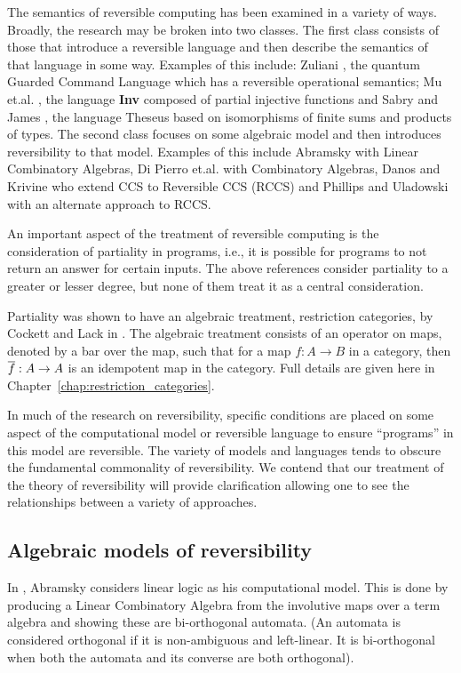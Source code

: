 The semantics of reversible computing has been examined in a variety of ways. Broadly, the research
may be broken into two classes. The first class consists of those that introduce a reversible
language and then describe the semantics of that language in some way. Examples of this include:
Zuliani \cite{zuliani01:reversibility}, the quantum Guarded Command Language which has a reversible
operational semantics; Mu et.al. \cite{muetal04:injreversible}, the language \textbf{Inv} composed
of partial injective functions and Sabry and James \cite{james2014theseus}, the language Theseus
based on isomorphisms of finite sums and products of types. The second class focuses on some
algebraic model and then introduces reversibility to that model. Examples of this include Abramsky
\cite{abramsky05:reversible} with Linear Combinatory Algebras, Di Pierro
et.al. \cite{DiPierro200625} with Combinatory Algebras, Danos and Krivine \cite{danos2004reversible}
who extend CCS\cite{milner1980calculus} to Reversible CCS (RCCS) and Phillips and Uladowski
\cite{phillips2006operational} with an alternate approach to RCCS.


An important aspect of the treatment of reversible computing is the consideration of partiality in
programs, i.e., it is possible for programs to not return an answer for certain inputs. The above
references consider partiality to a greater or lesser degree, but none of them treat it as a central
consideration.

Partiality was shown to have an algebraic treatment, restriction categories, by Cockett and Lack in
\cite{cockett2002:restcategories1,cockettlack2003:restcategories2,cockettlack2004:restcategories3}. The
algebraic treatment consists of an operator on maps, denoted by a bar over the map, such that for a
map $f:A\to B$ in a category, then $\overline{f}:A\to A$ is an idempotent map in the category. Full
details are given here in Chapter~\ref{chap:restriction_categories}.

In much of the research on reversibility, specific conditions are placed on some aspect of the
computational model or reversible language to ensure ``programs'' in this model are reversible.
The variety of models and languages tends to obscure the fundamental commonality of reversibility.
We contend that our treatment of the theory of reversibility will provide clarification allowing one
to see the relationships between a variety of approaches.

\subsection{Algebraic models of reversibility}
\label{subsec:algebraic_models_of_reversibility}
In \cite{abramsky05:reversible}, Abramsky considers linear logic as his computational model. This is
done by producing a Linear Combinatory Algebra \cite{abramsky02:GOI} from the involutive maps over a
term algebra and showing these are bi-orthogonal automata. (An automata is considered orthogonal if
it is non-ambiguous and left-linear. It is bi-orthogonal when both the automata and its converse are
both orthogonal).

